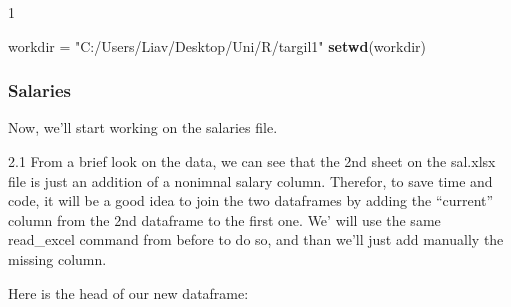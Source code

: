 \documentclass[]{article}
\title{}
\author{}
\date{}
\newenvironment{Shaded}{\begin{snugshade}}{\end{snugshade}}
\newcommand{\KeywordTok}[1]{\textcolor[rgb]{0.13,0.29,0.53}{\textbf{#1}}}
\newcommand{\DataTypeTok}[1]{\textcolor[rgb]{0.13,0.29,0.53}{#1}}
\newcommand{\DecValTok}[1]{\textcolor[rgb]{0.00,0.00,0.81}{#1}}
\newcommand{\StringTok}[1]{\textcolor[rgb]{0.31,0.60,0.02}{#1}}
\newcommand{\OperatorTok}[1]{\textcolor[rgb]{0.81,0.36,0.00}{\textbf{#1}}}
\newcommand{\NormalTok}[1]{#1}
\begin{document}
1

\begin{Shaded}
\begin{Highlighting}[]
\NormalTok{workdir =}\StringTok{ "C:/Users/Liav/Desktop/Uni/R/targil1"}
\KeywordTok{setwd}\NormalTok{(workdir)}
\end{Highlighting}
\end{Shaded}

\subsubsection{Salaries}\label{salaries}

Now, we'll start working on the salaries file.

2.1 From a brief look on the data, we can see that the 2nd sheet on the
sal.xlsx file is just an addition of a nonimnal salary column. Therefor,
to save time and code, it will be a good idea to join the two dataframes
by adding the ``current'' column from the 2nd dataframe to the first
one. We' will use the same read\_excel command from before to do so, and
than we'll just add manually the missing column.

\begin{Shaded}
\end{Shaded}

Here is the head of our new dataframe:

\begin{Shaded}
\end{Shaded}
\end{document}
